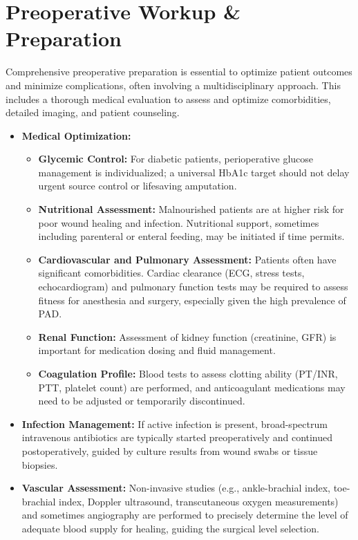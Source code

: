 \section*{Preoperative Workup \& Preparation}
Comprehensive preoperative preparation is essential to optimize patient outcomes and minimize complications, often involving a multidisciplinary approach. This includes a thorough medical evaluation to assess and optimize comorbidities, detailed imaging, and patient counseling.

\begin{itemize}
  \item \textbf{Medical Optimization:}
    \begin{itemize}
      \item \textbf{Glycemic Control:} For diabetic patients, perioperative glucose management is individualized; a universal HbA1c target should not delay urgent source control or lifesaving amputation.
      \item \textbf{Nutritional Assessment:} Malnourished patients are at higher risk for poor wound healing and infection. Nutritional support, sometimes including parenteral or enteral feeding, may be initiated if time permits.
      \item \textbf{Cardiovascular and Pulmonary Assessment:} Patients often have significant comorbidities. Cardiac clearance (ECG, stress tests, echocardiogram) and pulmonary function tests may be required to assess fitness for anesthesia and surgery, especially given the high prevalence of PAD.
      \item \textbf{Renal Function:} Assessment of kidney function (creatinine, GFR) is important for medication dosing and fluid management.
      \item \textbf{Coagulation Profile:} Blood tests to assess clotting ability (PT/INR, PTT, platelet count) are performed, and anticoagulant medications may need to be adjusted or temporarily discontinued.
    \end{itemize}
  \item \textbf{Infection Management:} If active infection is present, broad-spectrum intravenous antibiotics are typically started preoperatively and continued postoperatively, guided by culture results from wound swabs or tissue biopsies.
  \item \textbf{Vascular Assessment:} Non-invasive studies (e.g., ankle-brachial index, toe-brachial index, Doppler ultrasound, transcutaneous oxygen measurements) and sometimes angiography are performed to precisely determine the level of adequate blood supply for healing, guiding the surgical level selection.

\end{itemize}
